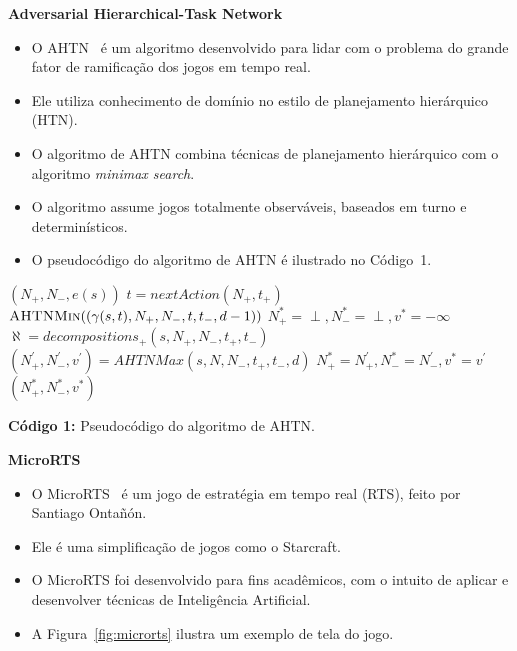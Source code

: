 \documentclass[a0,portrait]{a0poster}
\newcommand\itemadjust{\itemsep.5em \parskip0pt \parsep0pt}
\begin{document}
\begin{multicols}{2}
	\vspace{10mm}
	
	\textbf{Adversarial Hierarchical-Task Network}
	\begin{itemize}
		\item O AHTN~\cite{ontanon2015adversarial} é um algoritmo desenvolvido para lidar com o problema do grande fator de ramificação dos jogos em tempo real. 
		\item Ele utiliza conhecimento de domínio no estilo de planejamento hierárquico (HTN).
		\item O algoritmo de AHTN combina técnicas de planejamento hierárquico com o algoritmo \textit{minimax search}.
		\item O algoritmo assume jogos totalmente observáveis, baseados em turno e determinísticos. 
		\item O pseudocódigo do algoritmo de AHTN é ilustrado no Código~1.
	\end{itemize}
	
	\vspace{8mm}
	{\large	
	\begin{flushleft}

		\begin{algorithmic}[1]
			\label{alg:lin:firstLine}
			\State	\Return $(N_{+}, N_{-}, e(s))$
			\EndIf
			 \label{alg:ahtn:nexaction}
			\State $t = nextAction(N_{+}, t_{+})$ 
			\State \Return $\Call{AHTNMin}{(\gamma(s,t), N_{+}, N_{-}, t, t_{-}, d-1)}$ \label{alg:ahtn:troca}
			\EndIf
			\State $N_{+}^{*} = \perp, N_{-}^{*} = \perp, v^{*} = -\infty$
			\State $\aleph = decompositions_{+}(s, N_{+}, N_{-}, t_{+}, t_{-})$ \label{alg:decompositions}
			 \label{alg:ahtn:for}
			\State $(N^{'}_{+}, N^{'}_{-}, v^{'}) = AHTNMax(s, N, N_{-}, t_{+}, t_{-}, d)$
			\State $N_{+}^{*} = N^{'}_{+}, N_{-}^{*} = N^{'}_{-}, v^{*} = v^{'} $
			\EndIf
			\EndFor		
			\State \Return $(N_{+}^{*}, N_{-}^{*}, v^{*} )$
			\EndFunction
		\end{algorithmic}
	
	\begin{center}
		\textbf{Código 1:} Pseudocódigo do algoritmo de AHTN.
	\end{center}
	\end{flushleft}
}
	\vspace{10mm}
	\textbf{MicroRTS}
	\begin{itemize}
		\item O MicroRTS~\cite{ontanon2013combinatorial} é um jogo de estratégia em tempo real (RTS), feito por Santiago Ontañón.
		\item Ele é uma simplificação de jogos como o Starcraft. 
		\item O MicroRTS foi desenvolvido para fins acadêmicos, com o intuito de aplicar e desenvolver técnicas de Inteligência Artificial.
		\item A Figura~\ref{fig:microrts} ilustra um exemplo de tela do jogo.
	\end{itemize}
	

\end{multicols}
\end{document}
